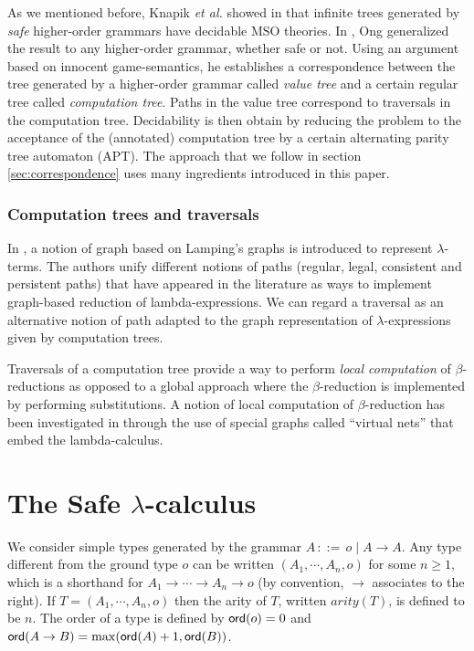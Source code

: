 \documentclass{llncs}
\newcommand\ord[1]{{\sf ord}(#1)}
\newcommand\typear{\rightarrow}
\begin{document}
As we mentioned before, Knapik \emph{et al.} showed in \cite{KNU02} that infinite trees generated by \emph{safe} higher-order grammars
have decidable MSO theories. In \cite{OngLics2006}, Ong generalized the result to any higher-order grammar, whether safe or not.
Using an argument based on innocent game-semantics, he establishes a correspondence between the tree generated by a higher-order grammar called \emph{value tree} and a certain regular tree called \emph{computation tree}. Paths in the value tree correspond to traversals in the computation tree. Decidability is then obtain by reducing the problem to the acceptance of the (annotated) computation tree by a certain alternating parity tree automaton (APT). The approach that we follow in section \ref{sec:correspondence} uses many ingredients introduced in this paper.


\subsubsection{Computation trees and traversals}

In \cite{DBLP:conf/lics/AspertiDLR94}, a notion of graph based on
Lamping's graphs \cite{lamping} is introduced to represent
$\lambda$-terms. The authors unify different notions of paths
(regular, legal, consistent and persistent paths) that have appeared
in the literature as ways to implement graph-based reduction of
lambda-expressions. We can regard a traversal as an alternative
notion of path adapted to the graph representation of
$\lambda$-expressions given by computation trees.

Traversals of a computation tree provide a way
to perform \emph{local computation} of $\beta$-reductions as opposed
to a global approach where the $\beta$-reduction is implemented by
performing substitutions. A notion of local computation of
$\beta$-reduction has been investigated in
\cite{DanosRegnier-Localandasynchronou} through the use of special
graphs called ``virtual nets'' that embed the lambda-calculus.


\section{The Safe $\lambda$-calculus}
We consider simple types generated by the grammar $A
\, ::= \, o \; | \; A \typear A$. Any type different from the ground
type $o$ can be written $(A_1, \cdots, A_n, o)$ for some $n \geq 1$,
which is a shorthand for $A_1 \typear \cdots \typear A_n \typear o$ (by
convention, $\rightarrow$ associates to the right). If $T=(A_1,
\cdots, A_n, o)$ then the arity of $T$, written $arity(T)$, is
defined to be $n$.
The order of a type is defined by $\ord{o} = 0$ and
$\ord{A \typear B} = \max(\ord{A}+1, \ord{B})$.
\end{document}
